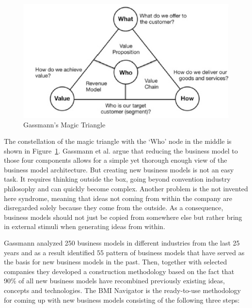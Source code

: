 		\begin{figure}[ht]
		    \begin{center}
		    \includegraphics[scale=0.6]{Talk11/Figure1.png}
		    \end{center}
		    \caption{Gassmann's Magic Triangle \cite[p. 91]{gassmann55}}
		    \label{fig:m_triangle}
		\end{figure}

		The constellation of the magic triangle with the `Who' node in the middle is shown in Figure~\ref{fig:m_triangle}. Gassmann et al. argue that reducing the business model to those four components allows for a simple yet thorough enough view of the business model architecture. But creating new business models is not an easy task. It requires thinking outside the box, going beyond convention industry philosophy and can quickly become complex. Another problem is the not invented here syndrome, meaning that ideas not coming from within the company are disregarded solely because they come from the outside. As a consequence, business models should not just be copied from somewhere else but rather bring in external stimuli when generating ideas from within.

		Gassmann analyzed 250 business models in different industries from the last 25 years and as a result identified 55 pattern of business models that have served as the basis for new business models in the past. Then, together with selected companies they developed a construction methodology based on the fact that 90\% of all new business models have recombined previously existing ideas, concepts and  technologies. The BMI Navigator is the ready-to-use methodology for coming up with new business models consisting of the following three steps:

